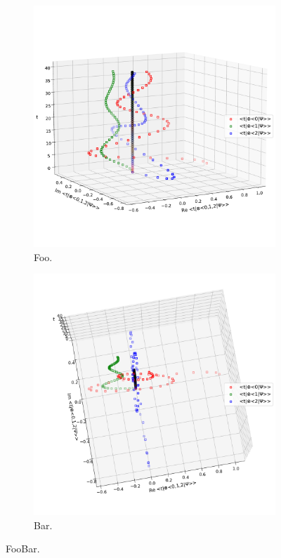 
\begin{figure}[h]
  \begin{subfigure}[b]{\textwidth}
    \centering
    \includegraphics[height=0.41\textheight,clip,trim=0 90 0 140]{img/3ldetect/PWSpaceTime_side.pdf}
    \caption{Foo.}
  \end{subfigure}
  \par\bigskip
  \begin{subfigure}[b]{\textwidth}
    \centering
    \includegraphics[height=0.48\textheight,clip,trim= 0 60 0 100]{img/3ldetect/PWSpaceTime_top.pdf}
    \caption{Bar.}
  \end{subfigure}
  \caption{FooBar.}
\end{figure}

